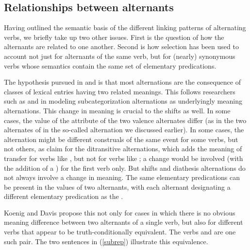 \documentclass[output=paper
 	        ,biblatex
                ,babelshorthands
                ,newtxmath
                ,draftmode
                ,colorlinks, citecolor=brown
]{langscibook}
\begin{document}
\subsection{Relationships between alternants}

Having outlined the semantic basis of the different linking patterns of alternating verbs, we briefly take up two other issues.
First is the question of how the alternants are related to one another.
Second is how  selection has been used to account not just for alternants of the same verb, but for (nearly) synonymous verbs whose semantics contain the same set of elementary predications.

The hypothesis pursued in \citet{Davis1996} and \citet{Davis2001}  is that 
most alternations are the consequence of classes of lexical entries having
two related meanings. This follows researchers such as \citet{Pinker1989} and \citet{Levin1993} in modeling subcategorization alternations as underlyingly meaning alternations. 
This change in meaning is crucial to the \citet{KoenigandDavis2006}  shifts as well. In some cases, the value of the \rels attribute of the two valence alternates differ (as in the two alternates of  in the so-called  alternation we discussed earlier).
In some cases, the alternation might be different construals of the same event for some verbs, but not others, as \citet{RappaportandLevin2008} claim for the  ditransitive alternations, which adds the meaning of transfer for verbs like , but not for verbs like ; a  change would be involved (with the addition of a ) for the first verb only. But  shifts and diathesis alternations do not always involve a change in meaning. The same elementary predications can be present in the  values of two alternants, with each alternant designating a different elementary predication as the .

Koenig and Davis propose this not only for cases in which there is no obvious meaning difference between two alternants of a single verb, but also for different verbs that appear to be truth-conditionally equivalent.
The verbs  and  are one such pair.
The two sentences in (\ref{subrep}) illustrate this equivalence.
\end{document}

